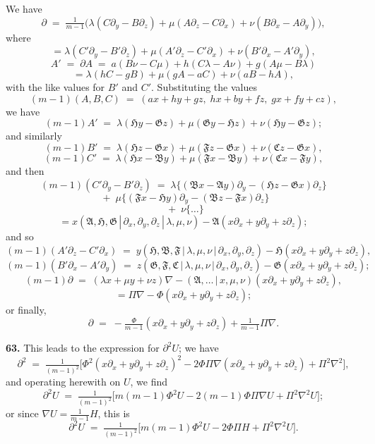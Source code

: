 \documentclass[11pt,a4paper]{article}
\providecommand{\mid}{\,|\,}
\begin{document}
We have
\[
\partial \;=\; \tfrac{1}{m-1}\bigl(\lambda(C\partial_y - B\partial_z) + \mu(A\partial_z - C\partial_x) + \nu(B\partial_x - A\partial_y)\bigr),
\]
where
\[
= \lambda(C'\partial_y - B'\partial_z) + \mu(A'\partial_z - C'\partial_x) + \nu(B'\partial_x - A'\partial_y),
\]
\[
A' \;=\; \partial A \;=\; a(B\nu - C\mu) + h(C\lambda - A\nu) + g(A\mu - B\lambda)
\]
\[
= \lambda(hC - gB) + \mu(gA - aC) + \nu(aB - hA),
\]
with the like values for $B'$ and $C'$. Substituting the values
\[
(m-1)(A,B,C) \;=\; (ax + hy + gz,\;hx + by + fz,\;gx + fy + cz),
\]
we have
\[
(m-1)A' \;=\; \lambda(\mathfrak{H}y - \mathfrak{G}z) + \mu(\mathfrak{G}y - \mathfrak{H}z) + \nu(\mathfrak{H}y - \mathfrak{G}z);
\]
and similarly
\[
(m-1)B' \;=\; \lambda(\mathfrak{H}z - \mathfrak{G}x) + \mu(\mathfrak{F}z - \mathfrak{G}x) + \nu(\mathfrak{C}z - \mathfrak{G}x),
\]
\[
(m-1)C' \;=\; \lambda(\mathfrak{H}x - \mathfrak{B}y) + \mu(\mathfrak{F}x - \mathfrak{B}y) + \nu(\mathfrak{C}x - \mathfrak{F}y),
\]
and then
\[
(m-1)(C'\partial_y - B'\partial_z) \;=\; \lambda\bigl\{(\mathfrak{B}x - \mathfrak{A}y)\partial_y - (\mathfrak{H}z - \mathfrak{G}x)\partial_z\bigr\}
\]
\[
\;+\; \mu\bigl\{(\mathfrak{F}x - \mathfrak{H}y)\partial_y - (\mathfrak{B}z - \mathfrak{F}x)\partial_z\bigr\}
\]
\[
\;+\; \nu\bigl\{\ldots\bigr\}
\]
\[
= x(\mathfrak{A},\mathfrak{H},\mathfrak{G}\mid \partial_x,\partial_y,\partial_z\mid \lambda,\mu,\nu) - \mathfrak{A}(x\partial_x + y\partial_y + z\partial_z);
\]
and so
\[
(m-1)(A'\partial_z - C'\partial_x) \;=\; y(\mathfrak{H},\mathfrak{B},\mathfrak{F}\mid \lambda,\mu,\nu\mid \partial_x,\partial_y,\partial_z) - \mathfrak{H}(x\partial_x + y\partial_y + z\partial_z),
\]
\[
(m-1)(B'\partial_x - A'\partial_y) \;=\; z(\mathfrak{G},\mathfrak{F},\mathfrak{C}\mid \lambda,\mu,\nu\mid \partial_x,\partial_y,\partial_z) - \mathfrak{G}(x\partial_x + y\partial_y + z\partial_z);
\]
\[
(m-1)\partial \;=\; (\lambda x + \mu y + \nu z)\nabla - (\mathfrak{A},\ldots\mid x,\mu,\nu)(x\partial_x + y\partial_y + z\partial_z),
\]
\[
= \Pi\nabla - \Phi(x\partial_x + y\partial_y + z\partial_z);
\]
or finally,
\[
\partial \;=\; -\tfrac{\Phi}{m-1}(x\partial_x + y\partial_y + z\partial_z) + \tfrac{1}{m-1}\Pi\nabla.
\]

\medskip

\textbf{63.} This leads to the expression for $\partial^2 U$; we have
\[
\partial^2 \;=\; \tfrac{1}{(m-1)^2}\bigl[\Phi^2(x\partial_x + y\partial_y + z\partial_z)^2 - 2\Phi\Pi\nabla(x\partial_x + y\partial_y + z\partial_z) + \Pi^2\nabla^2\bigr],
\]
and operating herewith on $U$, we find
\[
\partial^2 U \;=\; \tfrac{1}{(m-1)^2}\bigl[m(m-1)\Phi^2 U - 2(m-1)\Phi\Pi\nabla U + \Pi^2\nabla^2 U\bigr];
\]
or since $\nabla U = \tfrac{1}{m-1}H$, this is
\[
\partial^2 U \;=\; \tfrac{1}{(m-1)^2}\bigl[m(m-1)\Phi^2 U - 2\Phi\Pi H + \Pi^2\nabla^2 U\bigr].
\]
\end{document}
